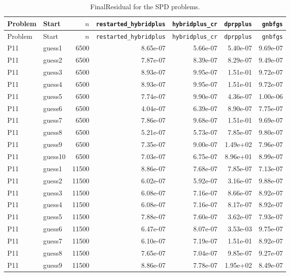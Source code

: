 {\footnotesize
\begin{longtable}{llrrrrr}
\caption{FinalResidual for the SPD problems.}\label{tab:spd_final_residual}\\
\toprule Problem & Start & $n$ & \texttt{restarted\_hybridplus} & \texttt{hybridplus\_cr} & \texttt{dprpplus} & \texttt{gnbfgs} \\
\midrule
\endfirsthead
\toprule Problem & Start & $n$ & \texttt{restarted\_hybridplus} & \texttt{hybridplus\_cr} & \texttt{dprpplus} & \texttt{gnbfgs} \\
\midrule
\endhead
\bottomrule
\endfoot
P11 & guess1 & 6500 & 8.65e-07 & 5.66e-07 & 5.40e-07 & 9.69e-07 \\
P11 & guess2 & 6500 & 7.87e-07 & 8.39e-07 & 8.29e-07 & 9.49e-07 \\
P11 & guess3 & 6500 & 8.93e-07 & 9.95e-07 & 1.51e-01 & 9.72e-07 \\
P11 & guess4 & 6500 & 8.93e-07 & 9.95e-07 & 1.51e-01 & 9.72e-07 \\
P11 & guess5 & 6500 & 7.74e-07 & 9.90e-07 & 4.36e-07 & 1.00e-06 \\
P11 & guess6 & 6500 & 4.04e-07 & 6.39e-07 & 8.90e-07 & 7.75e-07 \\
P11 & guess7 & 6500 & 7.86e-07 & 9.68e-07 & 1.51e-01 & 9.69e-07 \\
P11 & guess8 & 6500 & 5.21e-07 & 5.73e-07 & 7.85e-07 & 9.80e-07 \\
P11 & guess9 & 6500 & 7.35e-07 & 9.00e-07 & 1.49e+02 & 7.96e-07 \\
P11 & guess10 & 6500 & 7.03e-07 & 6.75e-07 & 8.96e+01 & 8.99e-07 \\
P11 & guess1 & 11500 & 8.86e-07 & 7.68e-07 & 7.85e-07 & 7.13e-07 \\
P11 & guess2 & 11500 & 6.02e-07 & 5.92e-07 & 3.16e-07 & 9.88e-07 \\
P11 & guess3 & 11500 & 6.08e-07 & 7.16e-07 & 8.66e-07 & 8.92e-07 \\
P11 & guess4 & 11500 & 6.08e-07 & 7.16e-07 & 8.17e-07 & 8.92e-07 \\
P11 & guess5 & 11500 & 7.88e-07 & 7.60e-07 & 3.62e-07 & 7.93e-07 \\
P11 & guess6 & 11500 & 6.47e-07 & 8.07e-07 & 3.53e-03 & 9.75e-07 \\
P11 & guess7 & 11500 & 6.10e-07 & 7.19e-07 & 1.51e-01 & 8.92e-07 \\
P11 & guess8 & 11500 & 7.65e-07 & 7.04e-07 & 9.85e-07 & 9.27e-07 \\
P11 & guess9 & 11500 & 8.86e-07 & 7.78e-07 & 1.95e+02 & 8.49e-07 \\

\end{longtable}}

